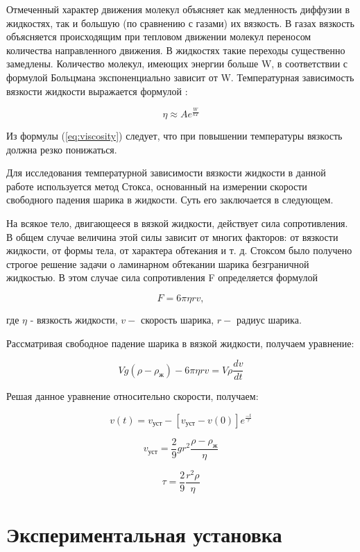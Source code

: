 \documentclass[12pt,a4paper]{article}
\begin{document}
Отмеченный характер движения молекул объясняет как медленность диффузии в жидкостях, так и большую (по сравнению с газами) их вязкость. В газах вязкость объясняется происходящим при тепловом движении молекул переносом количества направленного движения. В жидкостях такие переходы существенно замедлены. Количество молекул, имеющих энергии больше W, в соответствии с формулой Больцмана экспоненциально зависит от W. Температурная зависимость вязкости жидкости выражается формулой :

$$ \eta \approx Ae^{\frac{W}{kT}}$$\label{eq:viscosity}

Из формулы (\ref{eq:viscosity}) следует, что при повышении температуры вязкость должна резко понижаться.

Для исследования температурной зависимости вязкости жидкости в данной работе используется метод Стокса, основанный на измерении скорости свободного падения шарика в жидкости. Суть его заключается в следующем.

На всякое тело, двигающееся в вязкой жидкости, действует сила сопротивления. В общем случае величина этой силы зависит от многих факторов: от вязкости жидкости, от формы тела, от характера обтекания и т. д. Стоксом было получено строгое решение задачи о ламинарном обтекании шарика безграничной жидкостью. В этом случае сила сопротивления F определяется формулой

$$ F = 6\pi \eta rv,$$\label{eq:Stock's_force}

где $\eta$ - вязкость жидкости, $v - $ скорость шарика, $r - $ радиус шарика.

Рассматривая свободное падение шарика в вязкой жидкости, получаем уравнение:

$$Vg\left(\rho - \rho_{\text{ж}}\right) - 6\pi \eta rv = V\rho \frac{dv}{dt}$$\label{eq:Newton_second_law_for_ball}

Решая данное уравнение относительно скорости, получаем:

$$v\left(t\right) = v_{\text{уст}} - \left[v_{\text{уст}} - v\left(0\right)\right]e^{\frac{-t}{\tau}}$$\label{eq:velocity_equation}

$$v_{\text{уст}} = \frac{2}{9}gr^{2}\frac{\rho - \rho_{\text{ж}}}{\eta}$$ 

$$\tau = \frac{2}{9}\frac{r^{2}\rho}{\eta}$$

\section{Экспериментальная установка}
\end{document}
